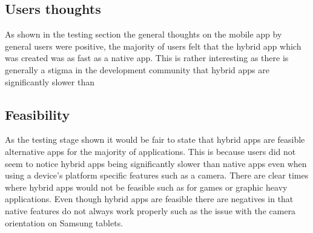 \subsection{Users thoughts}
As shown in the testing section the general thoughts on the mobile app by general users were positive, the majority of users felt that the hybrid app which was created was as fast as a native app. This is rather interesting as there is generally a stigma in the development community that hybrid apps are significantly slower than 

\subsection{Feasibility}
As the testing stage shown it would be fair to state that hybrid apps are feasible alternative apps for the majority of applications. This is because users did not seem to notice hybrid apps being significantly slower than native apps even when using a device's platform specific features such as a camera. There are clear times where hybrid apps would not be feasible such as for games or graphic heavy applications. Even though hybrid apps are feasible there are negatives in that native features do not always work properly such as the issue with the camera orientation on Samsung tablets.

